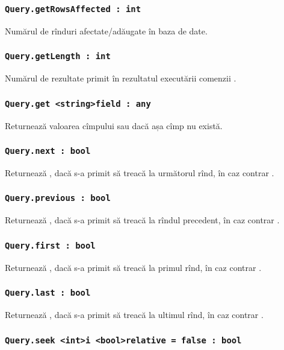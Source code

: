 \subsubsection{\lstinline|Query.getRowsAffected : int|}

Numărul de rînduri afectate/adăugate în baza de date.

\subsubsection{\lstinline|Query.getLength : int|}

Numărul de rezultate primit în rezultatul executării comenzii .

\subsubsection{\lstinline|Query.get <string>field : any|}

Returnează valoarea cîmpului  sau \void{} dacă așa cîmp nu există.

\subsubsection{\lstinline|Query.next : bool|}

Returnează \true, dacă s-a primit să treacă la următorul rînd, în caz contrar \false.

\subsubsection{\lstinline|Query.previous : bool|}

Returnează \true, dacă s-a primit să treacă la rîndul precedent, în caz contrar \false.

\subsubsection{\lstinline|Query.first : bool|}

Returnează \true, dacă s-a primit să treacă la primul rînd, în caz contrar \false.

\subsubsection{\lstinline|Query.last : bool|}

Returnează \true, dacă s-a primit să treacă la ultimul rînd, în caz contrar \false.

\subsubsection{\lstinline|Query.seek <int>i <bool>relative = false : bool|}

